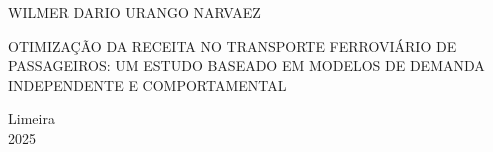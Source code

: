 \vspace*{5cm}


\begin{center}
	\large WILMER DARIO URANGO NARVAEZ
\end{center}


\vspace*{5cm}

\begin{center}
\large OTIMIZAÇÃO DA RECEITA NO TRANSPORTE FERROVIÁRIO DE PASSAGEIROS: UM ESTUDO BASEADO EM MODELOS DE DEMANDA INDEPENDENTE E COMPORTAMENTAL
\end{center}




\vspace*{5cm}


\begin{center}
	Limeira\\2025
\end{center}




